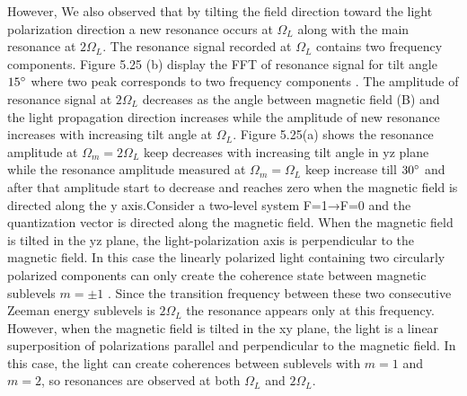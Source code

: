 \documentclass[12pt]{report}
\begin{document}
However, We also observed that by tilting the field direction toward the light polarization direction a new resonance occurs at $\Omega_L$ along with the main resonance at $2\Omega_L$. The resonance signal recorded at $\Omega_L$ contains two frequency components. Figure 5.25 (b) display the FFT of resonance signal for tilt angle $15\degree$ where two peak corresponds to two frequency components . The amplitude of  resonance signal at $2\Omega_L$  decreases as the angle between magnetic field (B) and the light propagation direction increases while the amplitude of new resonance  increases with increasing tilt angle at $\Omega_L$. Figure 5.25(a) shows the resonance amplitude at $\Omega_m=2\Omega_L$ keep decreases with increasing tilt angle in yz plane while  the resonance amplitude measured at $\Omega_m=\Omega_L$ keep increase till $30\degree$ and after that amplitude start to decrease and reaches zero when the magnetic field is directed along the y axis.Consider a two-level system F=1→F=0 and the quantization vector is directed along the magnetic field. When the magnetic field is tilted in the yz plane, the light-polarization axis is perpendicular to the magnetic field. In this case the linearly polarized light containing two circularly polarized components can only create the coherence state between magnetic sublevels $m = ±1$ . Since the transition frequency between these two consecutive Zeeman energy sublevels is $2\Omega_L$  the resonance appears only at this frequency. However, when the magnetic field is tilted  in the xy plane, the light is a linear superposition of polarizations parallel and perpendicular to the magnetic field. In this case, the light can create coherences between sublevels with $m=1$ and $m=2$, so resonances are observed at both $\Omega_L $ and $2\Omega_L$.
\end{document}
